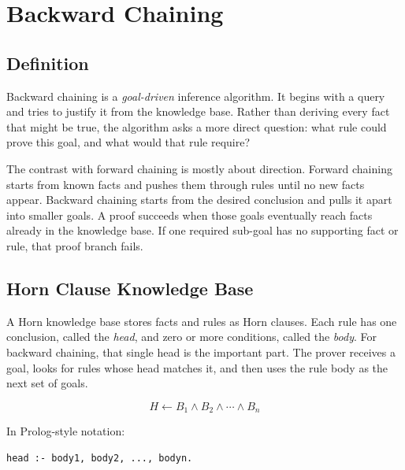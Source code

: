 \section{Backward Chaining}
\label{sec:backward_chaining}

\subsection{Definition}

Backward chaining is a \emph{goal-driven} inference algorithm.
It begins with a query and tries to justify it from the knowledge base.
Rather than deriving every fact that might be true, the algorithm asks a more
direct question: what rule could prove this goal, and what would that rule
require?

The contrast with forward chaining is mostly about direction.
Forward chaining starts from known facts and pushes them through rules until no
new facts appear.
Backward chaining starts from the desired conclusion and pulls it apart into
smaller goals.
A proof succeeds when those goals eventually reach facts already in the
knowledge base.
If one required sub-goal has no supporting fact or rule, that proof branch
fails.

\subsection{Horn Clause Knowledge Base}

A Horn knowledge base stores facts and rules as Horn clauses.
Each rule has one conclusion, called the \emph{head}, and zero or more
conditions, called the \emph{body}.
For backward chaining, that single head is the important part.
The prover receives a goal, looks for rules whose head matches it, and then
uses the rule body as the next set of goals.

\begin{equation}
  H \leftarrow B_1 \land B_2 \land \cdots \land B_n
\end{equation}

In Prolog-style notation:

\begin{verbatim}
head :- body1, body2, ..., bodyn.
\end{verbatim}

